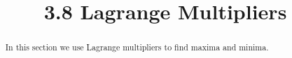 \documentclass[handout]{ximera}
\title{3.8 Lagrange Multipliers}
\begin{document}
\begin{abstract}
In this section we use Lagrange multipliers to find maxima and minima.
\end{abstract}

\maketitle
\end{document}
